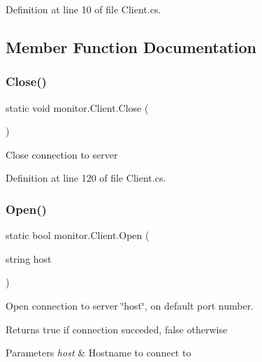 Definition at line 10 of file Client.\+cs.



\subsection{Member Function Documentation}
\mbox{\label{classmonitor_1_1_client_ae6c0cbe19d622b008fd1f6d01d9cb315}} 
\subsubsection{Close()}
{\footnotesize\ttfamily static void monitor.\+Client.\+Close (\begin{DoxyParamCaption}{ }\end{DoxyParamCaption})\hspace{0.3cm}{\ttfamily [static]}}



Close connection to server 



Definition at line 120 of file Client.\+cs.

\mbox{\label{classmonitor_1_1_client_af802cd428aa08b9604e2246f11e1fe61}} 
\subsubsection{Open()\hspace{0.1cm}{\footnotesize\ttfamily [1/2]}}
{\footnotesize\ttfamily static bool monitor.\+Client.\+Open (\begin{DoxyParamCaption}\item[{string}]{host }\end{DoxyParamCaption})\hspace{0.3cm}{\ttfamily [static]}}



Open connection to server \char`\"{}host\char`\"{}, on default port number. 

\begin{DoxyReturn}{Returns}
true if connection succeded, false otherwise
\end{DoxyReturn}

\begin{DoxyParams}{Parameters}
{\em host} & Hostname to connect to\\
\hline
\end{DoxyParams}



